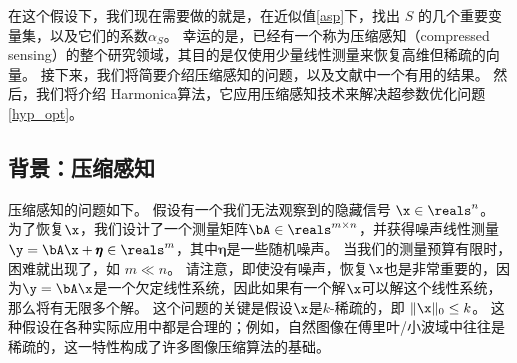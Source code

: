 在这个假设下，我们现在需要做的就是，在近似值\eqref{asp}下，找出 $S$ 的几个重要变量集，以及它们的系数$\alpha_S$。
幸运的是，已经有一个称为压缩感知（compressed sensing）的整个研究领域，其目的是仅使用少量线性测量来恢复高维但稀疏的向量。
接下来，我们将简要介绍压缩感知的问题，以及文献中一个有用的结果。
然后，我们将介绍 Harmonica算法，它应用压缩感知技术来解决超参数优化问题\eqref{hyp_opt}。

\subsection{
	背景：压缩感知
	} 
\label{sub:background_compressed_sensing}

压缩感知的问题如下。
假设有一个我们无法观察到的隐藏信号 $\x \in \reals^n$。
为了恢复$\x$，我们设计了一个测量矩阵$\bA \in \reals^{m \times n}$，并获得噪声线性测量$\y = \bA \x + \pmb{\eta} \in \reals^m$，其中$\pmb{\eta}$是一些随机噪声。
当我们的测量预算有限时，困难就出现了，如 $m \ll n$。
请注意，即使没有噪声，恢复$\x$也是非常重要的，因为$\y = \bA \x$是一个欠定线性系统，因此如果有一个解$\x$可以解这个线性系统，那么将有无限多个解。
这个问题的关键是假设$\x$是$k$-稀疏的，即 $\|\x\|_0 \le k$。
这种假设在各种实际应用中都是合理的；例如，自然图像在傅里叶/小波域中往往是稀疏的，这一特性构成了许多图像压缩算法的基础。

